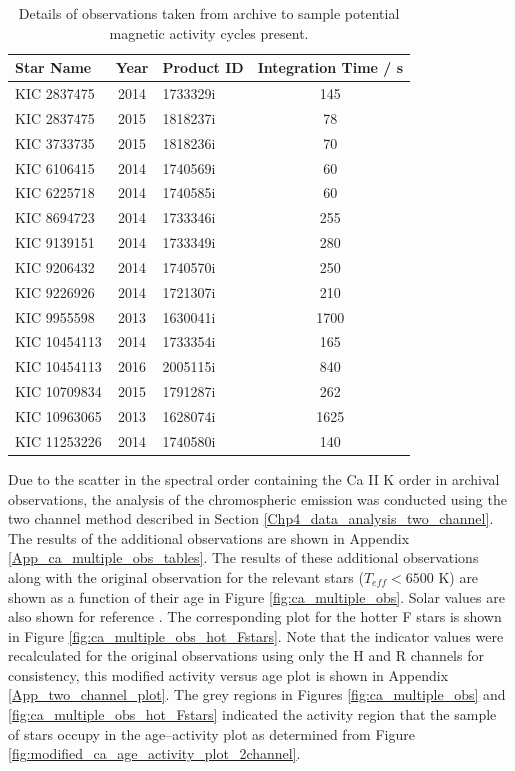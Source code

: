 \begin{table}
\centering
\begin{tabular}{lclc}
\hline
Star Name    & Year & Product ID & Integration Time / s \\
\hline
KIC 2837475  & 2014 & 1733329i   & 145                  \\
KIC 2837475  & 2015 & 1818237i   & 78                   \\
KIC 3733735  & 2015 & 1818236i   & 70                   \\
KIC 6106415  & 2014 & 1740569i   & 60                   \\
KIC 6225718  & 2014 & 1740585i   & 60                   \\
KIC 8694723  & 2014 & 1733346i   & 255                  \\
KIC 9139151  & 2014 & 1733349i   & 280                  \\
KIC 9206432  & 2014 & 1740570i   & 250                  \\
KIC 9226926  & 2014 & 1721307i   & 210                  \\
KIC 9955598  & 2013 & 1630041i   & 1700                 \\
KIC 10454113 & 2014 & 1733354i   & 165                  \\
KIC 10454113 & 2016 & 2005115i   & 840                  \\
KIC 10709834 & 2015 & 1791287i   & 262                  \\
KIC 10963065 & 2013 & 1628074i   & 1625                 \\
KIC 11253226 & 2014 & 1740580i   & 140					\\
\hline
\end{tabular}
\caption[Details of archival \esp observations]{Details of observations taken from \esp archive to sample potential magnetic activity cycles present.}
\label{Table:esp_additional_obs_table}
\end{table}

Due to the scatter in the spectral order containing the Ca II K order in archival observations, the analysis of the chromospheric emission was conducted using the two channel method described in Section \ref{Chp4_data_analysis_two_channel}. The results of the additional observations are shown in Appendix \ref{App_ca_multiple_obs_tables}. The results of these additional observations along with the original observation for the relevant stars ($T_{eff} < 6500$ K) are shown as a function of their age in Figure \ref{fig:ca_multiple_obs}. Solar values are also shown for reference \citep{Egeland_etal_2017}. The corresponding plot for the hotter F stars is shown in Figure \ref{fig:ca_multiple_obs_hot_Fstars}. Note that the \Rprime indicator values were recalculated for the original observations using only the H and R channels for consistency, this modified activity versus age plot is shown in Appendix \ref{App_two_channel_plot}. The grey regions in Figures \ref{fig:ca_multiple_obs} and \ref{fig:ca_multiple_obs_hot_Fstars} indicated the activity region that the sample of stars occupy in the age--activity plot as determined from Figure \ref{fig:modified_ca_age_activity_plot_2channel}.

